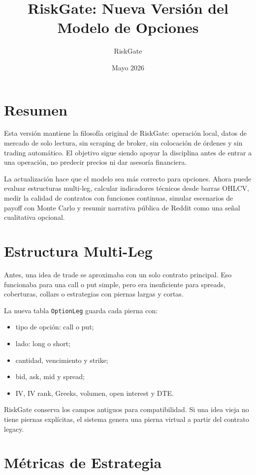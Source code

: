 \documentclass[11pt,letterpaper]{article}
\title{RiskGate: Nueva Versión del Modelo de Opciones}
\author{RiskGate}
\date{Mayo 2026}
\begin{document}
\maketitle

\section*{Resumen}

Esta versión mantiene la filosofía original de RiskGate: operación local, datos de mercado de solo lectura, sin scraping de broker, sin colocación de órdenes y sin trading automático. El objetivo sigue siendo apoyar la disciplina antes de entrar a una operación, no predecir precios ni dar asesoría financiera.

La actualización hace que el modelo sea más correcto para opciones. Ahora puede evaluar estructuras multi-leg, calcular indicadores técnicos desde barras OHLCV, medir la calidad de contratos con funciones continuas, simular escenarios de payoff con Monte Carlo y resumir narrativa pública de Reddit como una señal cualitativa opcional.

\section{Estructura Multi-Leg}

Antes, una idea de trade se aproximaba con un solo contrato principal. Eso funcionaba para una call o put simple, pero era insuficiente para spreads, coberturas, collars o estrategias con piernas largas y cortas.

La nueva tabla \texttt{OptionLeg} guarda cada pierna con:

\begin{itemize}
  \item tipo de opción: call o put;
  \item lado: long o short;
  \item cantidad, vencimiento y strike;
  \item bid, ask, mid y spread;
  \item IV, IV rank, Greeks, volumen, open interest y DTE.
\end{itemize}

RiskGate conserva los campos antiguos para compatibilidad. Si una idea vieja no tiene piernas explícitas, el sistema genera una pierna virtual a partir del contrato legacy.

\section{Métricas de Estrategia}
\end{document}
